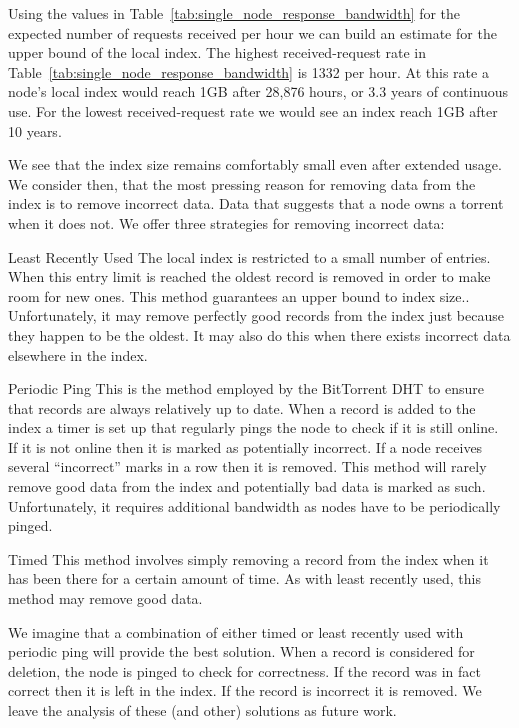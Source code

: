     Using the values in Table~\ref{tab:single_node_response_bandwidth} for the expected number of requests received per hour we can build an estimate for the upper bound of the local index.  The highest received-request rate in Table~\ref{tab:single_node_response_bandwidth} is 1332 per hour. At this rate a node's local index would reach 1GB after 28,876 hours, or 3.3 years of continuous use. For the lowest received-request rate we would see an index reach 1GB after 10 years.

    We see that the index size remains comfortably small even after extended usage. We consider then, that the most pressing reason for removing data from the index is to remove incorrect data. Data that suggests that a node owns a torrent when it does not. We offer three strategies for removing incorrect data:

    \begin{LaTeXdescription}
        \item[Least Recently Used] The local index is restricted to a small number of entries. When this entry limit is reached the oldest record is removed in order to make room for new ones. This method guarantees an upper bound to index size.. Unfortunately, it may remove perfectly good records from the index just because they happen to be the oldest. It may also do this when there exists incorrect data elsewhere in the index.
        \item[Periodic Ping] This is the method employed by the BitTorrent DHT to ensure that records are always relatively up to date. When a record is added to the index a timer is set up that regularly pings the node to check if it is still online. If it is not online then it is marked as potentially incorrect. If a node receives several ``incorrect'' marks in a row then it is removed. This method will rarely remove good data from the index and potentially bad data is marked as such. Unfortunately, it requires additional bandwidth as nodes have to be periodically pinged.
        \item[Timed] This method involves simply removing a record from the index when it has been there for a certain amount of time. As with least recently used, this method may remove good data.
    \end{LaTeXdescription}

    We imagine that a combination of either timed or least recently used with periodic ping will provide the best solution. When a record is considered for deletion, the node is pinged to check for correctness. If the record was in fact correct then it is left in the index. If the record is incorrect it is removed. We leave the analysis of these (and other) solutions as future work.
